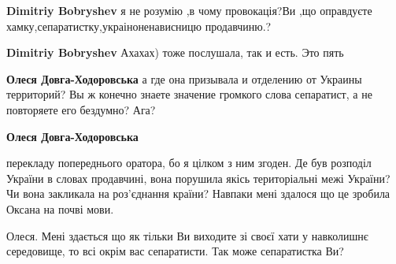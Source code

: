 \begin{itemize}
\begin{itemize}
\textbf{Dimitriy Bobryshev} я не розумію ,в чому провокація?Ви ,що оправдуєте хамку,сепаратистку,украіноненависницю продавчиню.?

 
\textbf{Dimitriy Bobryshev} Ахахах) тоже послушала, так и есть. Это пять

 
\textbf{Олеся Довга-Ходоровська} а где она призывала и отделению от Украины территорий? Вы ж конечно знаете значение громкого слова сепаратист, а не повторяете его бездумно? Ага?

 
\textbf{Олеся Довга-Ходоровська} 

перекладу попереднього оратора, бо я цілком з ним згоден. Де був розподіл
України в словах продавчині, вона порушила якісь територіальні межі України? Чи
вона закликала на роз'єднання країни? Навпаки мені здалося що це зробила Оксана
на почві мови.

Олеся. Мені здається що як тільки Ви виходите зі своєї хати у навколишнє
середовище, то всі окрім вас сепаратисти. Так може сепаратистка Ви?
\end{itemize}

\end{itemize}


